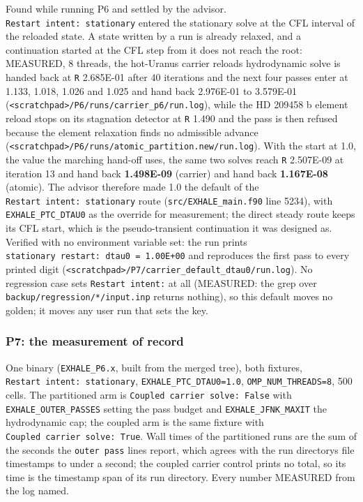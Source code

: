 \documentclass[english,a4paper]{my_memo}
\begin{document}
Found while running P6 and settled by the advisor. \texttt{Restart\ intent:\ stationary} entered the stationary solve at the CFL interval of the reloaded
state. A state written by a run is already relaxed, and a continuation
started at the CFL step from it does not reach the root: MEASURED, 8 threads,
the hot-Uranus carrier reload\textquotesingle s hydrodynamic solve is handed back at \texttt{\textbar{}\textbar{}R\textbar{}\textbar{}}
2.685E-01 after 40 iterations and the next four passes enter at 1.133, 1.018,
1.026 and 1.025 and hand back 2.976E-01 to 3.579E-01
(\texttt{\textless{}scratchpad\textgreater{}/P6/runs/carrier\_p6/run.log}), while the HD 209458 b element
reload stops on its stagnation detector at \texttt{\textbar{}\textbar{}R\textbar{}\textbar{}} 1.490 and the pass is then
refused because the element relaxation finds no admissible advance
(\texttt{\textless{}scratchpad\textgreater{}/P6/runs/atomic\_partition.new/run.log}). With the start at 1.0,
the value the marching hand-off uses, the same two solves reach \texttt{\textbar{}\textbar{}R\textbar{}\textbar{}}
2.507E-09 at iteration 13 and hand back \textbf{1.498E-09} (carrier) and hand back
\textbf{1.167E-08} (atomic). The advisor therefore made 1.0 the default of the
\texttt{Restart\ intent:\ stationary} route (\texttt{src/EXHALE\_main.f90} line 5234), with
\texttt{EXHALE\_PTC\_DTAU0} as the override for measurement; the direct steady route
keeps its CFL start, which is the pseudo-transient continuation it was
designed as. Verified with no environment variable set: the run prints
\texttt{stationary\ restart:\ dtau0\ =\ 1.00E+00} and reproduces the first pass to every
printed digit (\texttt{\textless{}scratchpad\textgreater{}/P7/carrier\_default\_dtau0/run.log}). No
regression case sets \texttt{Restart\ intent:} at all (MEASURED: the grep over
\texttt{backup/regression/*/input.inp} returns nothing), so this default moves no
golden; it moves any user run that sets the key.

\subsubsection{P7: the measurement of record}\label{p7-the-measurement-of-record}

One binary (\texttt{EXHALE\_P6.x}, built from the merged tree), both fixtures,
\texttt{Restart\ intent:\ stationary}, \texttt{EXHALE\_PTC\_DTAU0=1.0}, \texttt{OMP\_NUM\_THREADS=8},
500 cells. The partitioned arm is \texttt{Coupled\ carrier\ solve:\ False} with
\texttt{EXHALE\_OUTER\_PASSES} setting the pass budget and \texttt{EXHALE\_JFNK\_MAXIT} the
hydrodynamic cap; the coupled arm is the same fixture with \texttt{Coupled\ carrier\ solve:\ True}. Wall times of the partitioned runs are the sum of the seconds
the \texttt{outer\ pass} lines report, which agrees with the run directory\textquotesingle s file
timestamps to under a second; the coupled carrier control prints no total, so
its time is the timestamp span of its run directory. Every number MEASURED
from the log named.
\end{document}
